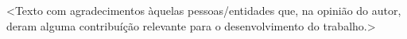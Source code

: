 \begin{agradecimentos}
\textless Texto com agradecimentos àquelas pessoas/entidades que, na opinião do autor, deram alguma contribuíção relevante para o desenvolvimento do trabalho.\textgreater
\end{agradecimentos}


